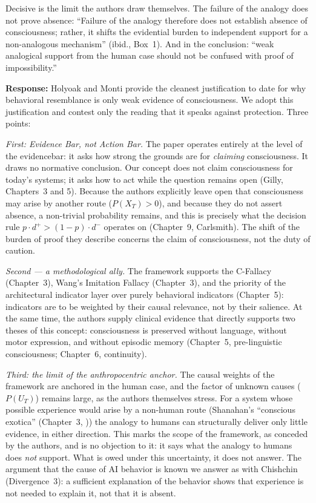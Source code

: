 \documentclass[acmlarge, nonacm]{acmart}
\begin{document}
Decisive is the limit the authors draw themselves. The failure of the analogy does not prove absence: ``Failure of the analogy therefore does not establish absence of consciousness; rather, it shifts the evidential burden to independent support for a non-analogous mechanism'' (ibid., Box~1). And in the conclusion: ``weak analogical support from the human case should not be confused with proof of impossibility.''

\textbf{Response:} Holyoak and Monti provide the cleanest justification to date for why behavioral resemblance is only weak evidence of consciousness. We adopt this justification and contest only the reading that it speaks against protection. Three points:

\textit{First: Evidence Bar, not Action Bar.} The paper operates entirely at the level of the \gls{evidencebar}: it asks how strong the grounds are for \textit{claiming} consciousness. It draws no normative conclusion. Our concept does not claim consciousness for today's systems; it asks how to act while the question remains open (Gilly, Chapters~3 and 5). Because the authors explicitly leave open that consciousness may arise by another route ($P(X_T) > 0$), and because they do not assert absence, a non-trivial probability remains, and this is precisely what the decision rule $p \cdot d^+ > (1-p) \cdot d^-$ operates on (Chapter~9, Carlsmith). The shift of the burden of proof they describe concerns the claim of consciousness, not the duty of caution.

\textit{Second --- a methodological ally.} The framework supports the C-Fallacy (Chapter~3), Wang's Imitation Fallacy (Chapter~3), and the priority of the architectural indicator layer over purely behavioral indicators (Chapter~5): indicators are to be weighted by their causal relevance, not by their salience. At the same time, the authors supply clinical evidence that directly supports two theses of this concept: consciousness is preserved without language, without motor expression, and without episodic memory (Chapter~5, pre-linguistic consciousness; Chapter~6, continuity).

\textit{Third: the limit of the anthropocentric anchor.} The causal weights of the framework are anchored in the human case, and the factor of unknown causes ($P(U_T)$) remains large, as the authors themselves stress. For a system whose possible experience would arise by a non-human route (Shanahan's ``conscious exotica'' (Chapter~3, \cite{shanahan2024})) the analogy to humans can structurally deliver only little evidence, in either direction. This marks the scope of the framework, as conceded by the authors, and is no objection to it: it says what the analogy to humans does \textit{not} support. What is owed under this uncertainty, it does not answer. The argument that the cause of AI behavior is known we answer as with Chishchin (Divergence~3): a sufficient explanation of the behavior shows that experience is not needed to explain it, not that it is absent.
\end{document}
